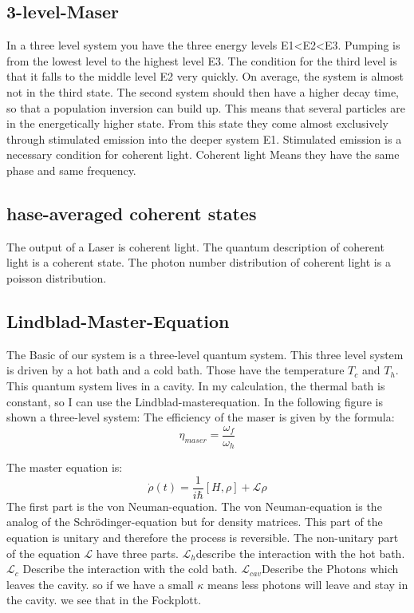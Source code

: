 \documentclass[12pt,a4paper]{article}
\begin{document}
\subsection{3-level-Maser}
In a three level system you have the three energy levels E1<E2<E3. Pumping is from the lowest level to the highest level E3. The condition for the third level is that it falls to the middle level E2 very quickly. On average, the system is almost not in the third state. The second system should then have a higher decay time, so that a population inversion can build up. This means that several particles are in the energetically higher state. From this state they come almost exclusively through stimulated emission into the deeper system E1. Stimulated emission is a necessary condition for coherent light. Coherent light Means they have the same phase and same frequency.
\subsection{hase-averaged coherent states}
The output of a Laser is coherent light.
The quantum description of coherent light is a coherent state. The photon number distribution of coherent light is a poisson distribution. 

\subsection{Lindblad-Master-Equation}
The Basic of our system is a three-level quantum system. This three level system is driven by a hot bath and a cold bath. Those have the temperature $T_c$ and $T_h$. This quantum system lives in a cavity. 
In my calculation, the thermal bath is constant, so I can use the Lindblad-masterequation. 
In the following figure is shown a three-level system:
The efficiency of the maser is given by the formula:
\begin{equation}
\eta_{maser}=\frac{\omega_f}{\omega_h}
\end{equation}

\newpage
The master equation is:
\begin{equation}
\dot{\rho}(t)=\frac{1}{i \hbar}[H,\rho]+ \mathcal{L}\rho
\end{equation}
The first part is the von Neuman-equation. The von Neuman-equation is the analog of the Schrödinger-equation but for density matrices. This part of the equation is unitary and therefore the process is reversible.
The non-unitary part of the equation 
$\mathcal{L}$ have three parts. $\mathcal{L}_h$describe the interaction with the hot bath.
$\mathcal{L}_c$ Describe the interaction with the cold bath.
$\mathcal{L}_{cav}$Describe the Photons which leaves the cavity. so if we have a small $\kappa$ means less photons will leave and stay in the cavity. we see that in the Fockplott.
\end{document}
